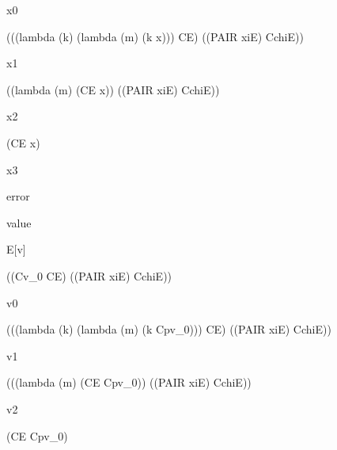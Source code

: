 \documentclass[ms,electronic,twosidetoc,letterpaper,chaptercenter,parttop]{byumsphd}
\begin{document}
\begin{singlespace}
x0
\begin{schemedisplay}
(((lambda (k) (lambda (m) (k x))) CE) ((PAIR xiE) CchiE))
\end{schemedisplay}

x1
\begin{schemedisplay}
((lambda (m) (CE x)) ((PAIR xiE) CchiE))
\end{schemedisplay}

x2
\begin{schemedisplay}
(CE x)
\end{schemedisplay}

x3
\begin{schemedisplay}
error
\end{schemedisplay}

value
\begin{schemedisplay}
E[v]
\end{schemedisplay}

\begin{schemedisplay}
((Cv_0 CE) ((PAIR xiE) CchiE))
\end{schemedisplay}

v0
\begin{schemedisplay}
(((lambda (k) (lambda (m) (k Cpv_0))) CE) ((PAIR xiE) CchiE))
\end{schemedisplay}

v1
\begin{schemedisplay}
(((lambda (m) (CE Cpv_0)) ((PAIR xiE) CchiE))
\end{schemedisplay}

v2
\begin{schemedisplay}
(CE Cpv_0)
\end{schemedisplay}
\end{singlespace}



\end{document}
